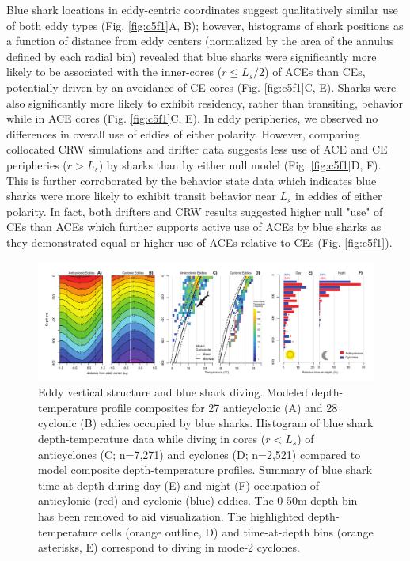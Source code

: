 Blue shark locations in eddy-centric coordinates suggest qualitatively similar use of both eddy types (Fig. \ref{fig:c5f1}A, B); however, histograms of shark positions as a function of distance from eddy centers (normalized by the area of the annulus defined by each radial bin) revealed that blue sharks were significantly more likely to be associated with the inner-cores ($r \leq L_s / 2$) of ACEs than CEs, potentially driven by an avoidance of CE cores (Fig. \ref{fig:c5f1}C, E). Sharks were also significantly more likely to exhibit residency, rather than transiting, behavior while in ACE cores (Fig. \ref{fig:c5f1}C, E). In eddy peripheries, we observed no differences in overall use of eddies of either polarity. However, comparing collocated CRW simulations and drifter data suggests less use of ACE and CE peripheries ($r > L_s$) by sharks than by either null model (Fig. \ref{fig:c5f1}D, F). This is further corroborated by the behavior state data which indicates blue sharks were more likely to exhibit transit behavior near $L_s$ in eddies of either polarity. In fact, both drifters and CRW results suggested higher null "use" of CEs than ACEs which further supports active use of ACEs by blue sharks as they demonstrated equal or higher use of ACEs relative to CEs (Fig. \ref{fig:c5f1}).

\begin{figure}[htbp]
\centering
\includegraphics[width=\textwidth]{images/C5_Fig2.pdf}
\caption[Eddy vertical structure and blue shark diving]{Eddy vertical structure and blue shark diving. Modeled depth-temperature profile composites for 27 anticyclonic (A) and 28 cyclonic (B) eddies occupied by blue sharks. Histogram of blue shark depth-temperature data while diving in cores ($r < L_s$) of anticyclones (C; n=7,271) and cyclones (D; n=2,521) compared to model composite depth-temperature profiles. Summary of blue shark time-at-depth during day (E) and night (F) occupation of anticylonic (red) and cyclonic (blue) eddies. The 0-50m depth bin has been removed to aid visualization. The highlighted depth-temperature cells (orange outline, D) and time-at-depth bins (orange asterisks, E) correspond to diving in mode-2 cyclones.}
\label{fig:c5f2}
\end{figure}


